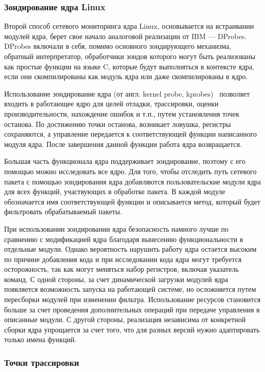 \subsubsection{Зондирование ядра Linux}
Второй способ сетевого мониторинга ядра Linux, основывается на встраивании модулей ядра, берет свое начало аналоговой реализации от IBM --- DProbes. DProbes включали в себя, помимо основного зондирующего механизма, обратный интерпретатор, обработчики зондов которого могут быть реализованы как простые функции на языке C, которые будут выполняться в контексте ядра, если они скомпилированы как модуль ядра или даже скомпилированы в ядро.~\cite{kernel_probes_ibm}

Использование зондирование ядра (от англ. kernel probe, kprobes)~\cite{kernel_probes} позволяет входить в работающее ядро для целей отладки, трассировки, оценки производительности, нахождение ошибок и т.п., путем установления точек останова. 
По достижению точки останова, возникает ловушка, регистры сохраняются, а управление передается к соответствующей функции написанного модуля ядра.
После завершения данной функции работа ядра возвращается.  

Большая часть функционала ядра поддерживает зондирование, поэтому с его помощью можно исследовать все ядро. Для того, чтобы отследить путь сетевого пакета с помощью зондирования ядра добавляются пользовательские модули ядра для всех функций, участвующих в обработке пакета. В каждой модуле обозначается имя соответствующей функции и описывается метод, который будет фильтровать обрабатываемый пакеты.

При использовании зондировании ядра безопасность намного лучше по сравнению с модификацией ядра благодаря вынесению функциональности в отдельные модули. 
Однако вероятность нарушить работу ядра остается высоким по причине добавления кода и при исследовании кода ядра могут требуется осторожность, так как могут меняться набор регистров, включая указатель команд.
С одной стороны, за счет динамической загрузки модулей ядра появляется возможность запуска на работающей системе, но осложняется путем пересборки модулей при изменении фильтра. 
Использование ресурсов становится больше за счет проведения дополнительных операций при передаче управления в описанные модули. 
С другой стороны, реализация независима от конкретной сборки ядра упрощается за счет того, что для разных версий нужно адаптировать только имена функций.

\subsubsection{Точки трассировки}

